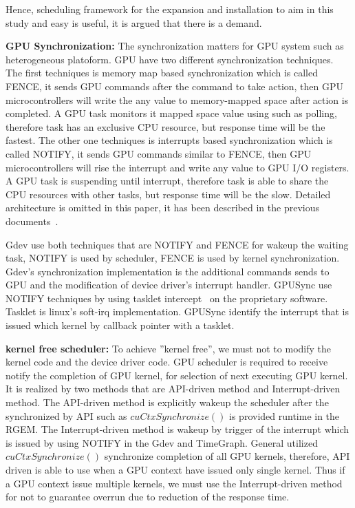 Hence, scheduling framework for the expansion and installation to aim in this study and easy is useful,
it is argued that there is a demand.

\textbf{GPU Synchronization:}
The synchronization matters for GPU system such as heterogeneous platoform.
GPU have two different synchronization techniques.
The first techniques is memory map based synchronization which is called FENCE,
it sends GPU commands after the command to take action,
then GPU microcontrollers will write the any value to memory-mapped space after action is completed.
A GPU task monitors it mapped space value using such as polling,
therefore task has an exclusive CPU resource,
but response time will be the fastest.
The other one techniques is interrupts based synchronization which is called NOTIFY,
it sends GPU commands similar to FENCE,
then GPU microcontrollers will rise the interrupt and write any value to GPU I/O registers.
A GPU task is suspending until interrupt,
therefore task is able to share the CPU resources with other tasks,
but response time will be the slow. Detailed architecture is omitted in this paper,
it has been described in the previous documents~\cite{kato:timegraph, kato:gdev, fujii:apsys2013}.

Gdev use both techniques that are NOTIFY and FENCE for wakeup the waiting task,
NOTIFY is used by scheduler, FENCE is used by kernel synchronization. 
Gdev’s synchronization implementation is the additional commands sends to GPU and the modification of device driver’s interrupt handler.
GPUSync use NOTIFY techniques by using tasklet intercept~\cite{elliott2012robust} on the proprietary software.
Tasklet is linux’s soft-irq implementation.
GPUSync identify the interrupt that is issued which kernel by callback pointer with a tasklet.

\textbf{kernel free scheduler:}
To achieve ”kernel free”,
we must not to modify the kernel code and the device driver code.
GPU scheduler is required to receive notify the completion of GPU kernel, for selection of next executing GPU kernel.
It is realized by two methods that are API-driven method and Interrupt-driven method.
The API-driven method is explicitly wakeup the scheduler after the synchronized by API such as $cuCtxSynchronize()$ is provided runtime in the RGEM.
The Interrupt-driven method is wakeup by trigger of the interrupt which is issued by using NOTIFY in the Gdev and TimeGraph.
General utilized $cuCtxSynchronize()$ synchronize completion of all GPU kernels, therefore, API driven is able to use when a GPU context have issued only single kernel.
Thus if a GPU context issue multiple kernels, we must use the Interrupt-driven method for not to guarantee overrun due to reduction of the response time.

